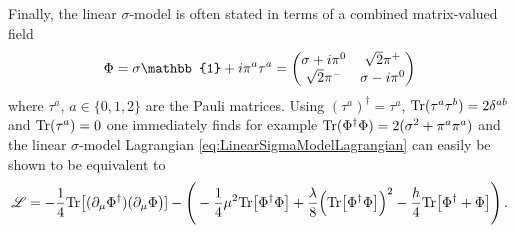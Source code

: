 Finally, the linear $\sigma$-model is often stated in terms of a combined matrix-valued field
\begin{equation}
    \Phi=\sigma\mathbb{1}+\imagu\pi^a\tau^a=\begin{pmatrix}
        \sigma+\imagu\pi^0 & \sqrt{2}\pi^+      \\
        \sqrt{2}\pi^-      & \sigma-\imagu\pi^0
    \end{pmatrix}
\end{equation}
where $\tau^a$, ${a\in\{0,1,2\}}$ are the Pauli matrices. Using ${(\tau^a)^\dagger=\tau^a}$, ${{\text{Tr}}(\tau^a\tau^b)=2\delta^{ab}}$ and ${{\text{Tr}}(\tau^a)=0}$ one immediately finds for example ${{\text{Tr}}(\Phi^\dagger\Phi)=2(\sigma^2+\pi^a\pi^a)}$ and the linear $\sigma$-model Lagrangian \eqref{eq:LinearSigmaModelLagrangian} can easily be shown to be equivalent to
\begin{equation}
    \mathscr{L}=-\frac{1}{4}{\text{Tr}}\big[(\partial_\mu\Phi^\dagger)(\partial_\mu\Phi\big)]-\Bigg(-\frac{1}{4}\mu^2{\text{Tr}}\big[\Phi^\dagger\Phi\big]+\frac{\lambda}{8}\Big({\text{Tr}}\big[\Phi^\dagger\Phi\big]\Big)^2-\frac{h}{4}{\text{Tr}}\big[\Phi^\dagger+\Phi\big]\Bigg)\,.
    \label{eq:Lagrangian_LinearSigma2}
\end{equation}
